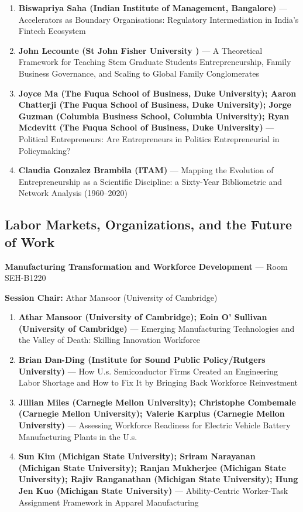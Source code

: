 \documentclass[
  10pt,
  letterpaper,
  DIV=11,
  numbers=noendperiod]{scrartcl}
\begin{document}
\begin{enumerate}
\def\labelenumi{\arabic{enumi}.}
\item
  \textbf{Biswapriya Saha (Indian Institute of Management, Bangalore)}
  --- Accelerators as Boundary Organisations: Regulatory Intermediation
  in India's Fintech Ecosystem
\item
  \textbf{John Lecounte (St John Fisher University )} --- A Theoretical
  Framework for Teaching Stem Graduate Students Entrepreneurship, Family
  Business Governance, and Scaling to Global Family Conglomerates
\item
  \textbf{Joyce Ma (The Fuqua School of Business, Duke University);
  Aaron Chatterji (The Fuqua School of Business, Duke University); Jorge
  Guzman (Columbia Business School, Columbia University); Ryan Mcdevitt
  (The Fuqua School of Business, Duke University)} --- Political
  Entrepreneurs: Are Entrepreneurs in Politics Entrepreneurial in
  Policymaking?
\item
  \textbf{Claudia Gonzalez Brambila (ITAM)} --- Mapping the Evolution of
  Entrepreneurship as a Scientific Discipline: a Sixty-Year Bibliometric
  and Network Analysis (1960--2020)
\end{enumerate}

\subsection{\texorpdfstring{\textcolor{labor}{Labor Markets, Organizations, and the Future of Work}}{}}\label{section-18}

\textbf{Manufacturing Transformation and Workforce Development} --- Room
SEH-B1220

\textbf{Session Chair:} Athar Mansoor (University of Cambridge)

\begin{enumerate}
\def\labelenumi{\arabic{enumi}.}
\item
  \textbf{Athar Mansoor (University of Cambridge); Eoin O' Sullivan
  (University of Cambridge)} --- Emerging Manufacturing Technologies and
  the Valley of Death: Skilling Innovation Workforce
\item
  \textbf{Brian Dan-Ding (Institute for Sound Public Policy/Rutgers
  University)} --- How U.s. Semiconductor Firms Created an Engineering
  Labor Shortage and How to Fix It by Bringing Back Workforce
  Reinvestment
\item
  \textbf{Jillian Miles (Carnegie Mellon University); Christophe
  Combemale (Carnegie Mellon University); Valerie Karplus (Carnegie
  Mellon University)} --- Assessing Workforce Readiness for Electric
  Vehicle Battery Manufacturing Plants in the U.s.
\item
  \textbf{Sun Kim (Michigan State University); Sriram Narayanan
  (Michigan State University); Ranjan Mukherjee (Michigan State
  University); Rajiv Ranganathan (Michigan State University); Hung Jen
  Kuo (Michigan State University)} --- Ability-Centric Worker-Task
  Assignment Framework in Apparel Manufacturing
\end{enumerate}
\end{document}
